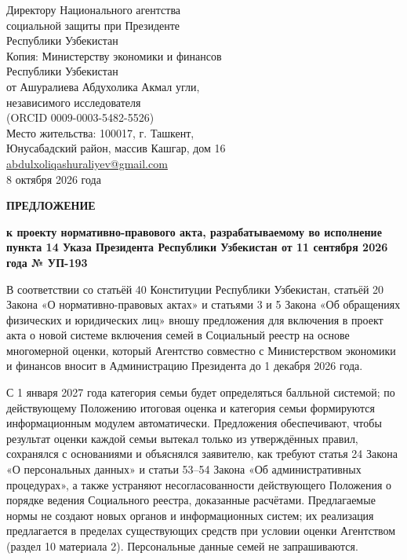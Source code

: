 \documentclass[14pt,a4paper]{extarticle}
\begin{document}
\begin{flushright}
Директору Национального агентства\\
социальной защиты при Президенте\\
Республики Узбекистан\\[2mm]
Копия: Министерству экономики и финансов\\
Республики Узбекистан\\[4mm]
от Ашуралиева Абдухолика Акмал угли,\\
независимого исследователя\\
(ORCID 0009-0003-5482-5526)\\
Место жительства: 100017, г. Ташкент,\\
Юнусабадский район, массив Кашгар, дом 16\\
\href{mailto:abdulxoliqashuraliyev@gmail.com}{abdulxoliqashuraliyev@gmail.com}\\[2mm]
8 октября 2026 года
\end{flushright}

\begin{center}\textbf{ПРЕДЛОЖЕНИЕ}\par
\textbf{к проекту нормативно-правового акта, разрабатываемому во исполнение пункта 14 Указа Президента Республики Узбекистан от 11 сентября 2026 года № УП-193}\end{center}

В соответствии со статьёй 40 Конституции Республики Узбекистан, статьёй 20 Закона «О нормативно-правовых актах» и статьями 3 и 5 Закона «Об обращениях физических и юридических лиц» вношу предложения для включения в проект акта о новой системе включения семей в Социальный реестр на основе многомерной оценки, который Агентство совместно с Министерством экономики и финансов вносит в Администрацию Президента до 1 декабря 2026 года.

С 1 января 2027 года категория семьи будет определяться балльной системой; по действующему Положению итоговая оценка и категория семьи формируются информационным модулем автоматически. Предложения обеспечивают, чтобы результат оценки каждой семьи вытекал только из утверждённых правил, сохранялся с основаниями и объяснялся заявителю, как требуют статья 24 Закона «О персональных данных» и статьи 53–54 Закона «Об административных процедурах», а также устраняют несогласованности действующего Положения о порядке ведения Социального реестра, доказанные расчётами. Предлагаемые нормы не создают новых органов и информационных систем; их реализация предлагается в пределах существующих средств при условии оценки Агентством (раздел 10 материала 2). Персональные данные семей не запрашиваются.
\end{document}
